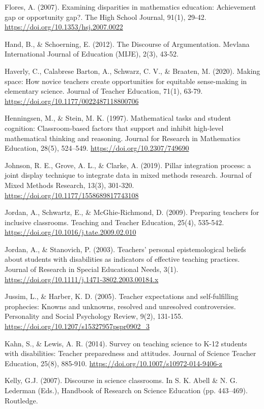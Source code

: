 \documentclass{sig-alternate} %
\begin{document}
Flores, A. (2007). Examining disparities in mathematics education: Achievement gap or opportunity gap?. The High School Journal, 91(1), 29-42. \url{https://doi.org/10.1353/hsj.2007.0022}

Hand, B., \& Schoerning, E. (2012). The Discourse of Argumentation. Mevlana International Journal of Education (MIJE), 2(3), 43-52.

Haverly, C., Calabrese Barton, A., Schwarz, C. V., \& Braaten, M. (2020). Making space: How novice teachers create opportunities for equitable sense-making in elementary science. Journal of Teacher Education, 71(1), 63-79. \url{https://doi.org/10.1177/0022487118800706}

Henningsen, M., \& Stein, M. K. (1997). Mathematical tasks and student cognition: Classroom-based factors that support and inhibit high-level mathematical thinking and reasoning. Journal for Research in Mathematics Education, 28(5), 524–549. \url{https://doi.org/10.2307/749690}

Johnson, R. E., Grove, A. L., \& Clarke, A. (2019). Pillar integration process: a joint display technique to integrate data in mixed methods research. Journal of Mixed Methods Research, 13(3), 301-320. \url{https://doi.org/10.1177/1558689817743108}

Jordan, A., Schwartz, E., \& McGhie-Richmond, D. (2009). Preparing teachers for inclusive classrooms. Teaching and Teacher Education, 25(4), 535-542. \url{https://doi.org/10.1016/j.tate.2009.02.010}

Jordan, A., \& Stanovich, P. (2003). Teachers’ personal epistemological beliefs about students with disabilities as indicators of effective teaching practices. Journal of Research in Special Educational Needs, 3(1). \url{https://doi.org/10.1111/j.1471-3802.2003.00184.x}

Jussim, L., \& Harber, K. D. (2005). Teacher expectations and self-fulfilling prophecies: Knowns and unknowns, resolved and unresolved controversies. Personality and Social Psychology Review, 9(2), 131-155. \url{https://doi.org/10.1207/s15327957pspr0902_3}

Kahn, S., \& Lewis, A. R. (2014). Survey on teaching science to K-12 students with disabilities: Teacher preparedness and attitudes. Journal of Science Teacher Education, 25(8), 885-910. \url{https://doi.org/10.1007/s10972-014-9406-z}

Kelly, G.J. (2007). Discourse in science classrooms. In S. K. Abell \& N. G. Lederman (Eds.), Handbook of Research on Science Education (pp. 443–469). Routledge.
\end{document}
